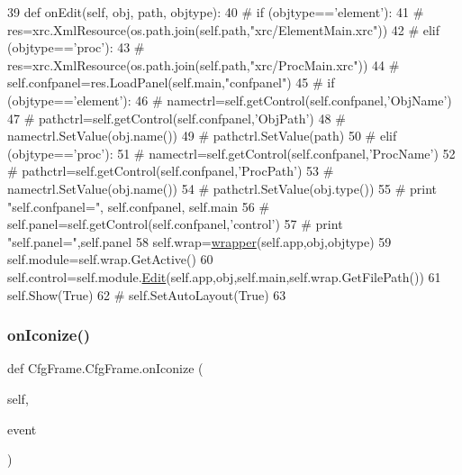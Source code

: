 \begin{DoxyCode}
39     \textcolor{keyword}{def }onEdit(self, obj, path, objtype):
40          \textcolor{comment}{# if (objtype=='element'):}
41         \textcolor{comment}{#     res=xrc.XmlResource(os.path.join(self.path,"xrc/ElementMain.xrc"))}
42         \textcolor{comment}{# elif (objtype=='proc'):}
43         \textcolor{comment}{#     res=xrc.XmlResource(os.path.join(self.path,"xrc/ProcMain.xrc"))}
44         \textcolor{comment}{# self.confpanel=res.LoadPanel(self.main,"confpanel")}
45         \textcolor{comment}{# if (objtype=='element'):}
46         \textcolor{comment}{#     namectrl=self.getControl(self.confpanel,'ObjName')}
47         \textcolor{comment}{#     pathctrl=self.getControl(self.confpanel,'ObjPath')}
48         \textcolor{comment}{#     namectrl.SetValue(obj.name())}
49         \textcolor{comment}{#     pathctrl.SetValue(path)}
50         \textcolor{comment}{# elif (objtype=='proc'):}
51         \textcolor{comment}{#     namectrl=self.getControl(self.confpanel,'ProcName')}
52         \textcolor{comment}{#     pathctrl=self.getControl(self.confpanel,'ProcPath')}
53         \textcolor{comment}{#     namectrl.SetValue(obj.name())}
54         \textcolor{comment}{#     pathctrl.SetValue(obj.type())}
55         \textcolor{comment}{# print "self.confpanel=", self.confpanel, self.main}
56         \textcolor{comment}{# self.panel=self.getControl(self.confpanel,'control')}
57         \textcolor{comment}{# print "self.panel=",self.panel}
58         self.wrap=\hyperlink{namespacewrapper}{wrapper}(self.app,obj,objtype)
59         self.module=self.wrap.GetActive()
60         self.control=self.module.\hyperlink{namespaceCroc_ac1007cd977e479210af9ec4c28eba462}{Edit}(self.app,obj,self.main,self.wrap.GetFilePath())
61         self.Show(\textcolor{keyword}{True})
62 \textcolor{comment}{#        self.SetAutoLayout(True)}
63                 
\end{DoxyCode}
\mbox{\label{classCfgFrame_1_1CfgFrame_adc334ba0611bcc77be88db2d9956e784}} 
\subsubsection{\texorpdfstring{on\+Iconize()}{onIconize()}}
{\footnotesize\ttfamily def Cfg\+Frame.\+Cfg\+Frame.\+on\+Iconize (\begin{DoxyParamCaption}\item[{}]{self,  }\item[{}]{event }\end{DoxyParamCaption})}



